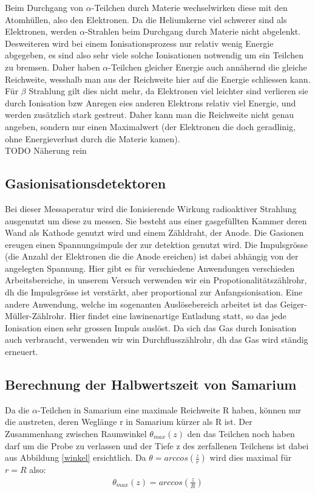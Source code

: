 \documentclass[12pt]{article}
\begin{document}
Beim Durchgang von $\alpha$-Teilchen durch Materie wechselwirken diese mit den Atomhüllen, also den Elektronen. Da die Heliumkerne viel schwerer sind als Elektronen, werden $\alpha$-Strahlen beim Durchgang durch Materie nicht abgelenkt. Desweiteren wird bei einem Ionisationsprozess nur relativ wenig Energie abgegeben, es sind also sehr viele solche Ionisationen notwendig um ein Teilchen zu bremsen. Daher haben $\alpha$-Teilchen gleicher Energie auch annähernd die gleiche Reichweite, wesshalb man aus der Reichweite hier auf die Energie schliessen kann.
\\
Für $\beta$ Strahlung gilt dies nicht mehr, da Elektronen viel leichter sind verlieren sie durch Ionisation bzw Anregen eies anderen Elektrons relativ viel Energie, und werden zusätzlich stark gestreut. Daher kann man die Reichweite nicht genau angeben, sondern nur einen Maximalwert (der Elektronen die doch geradlinig, ohne Energieverlust durch die Materie kamen). \\ TODO Näherung rein
\newpage

\subsection{Gasionisationsdetektoren}

Bei dieser Messaperatur wird die Ionisierende Wirkung radioaktiver Strahlung ausgenutzt um diese zu messen. Sie besteht aus einer gasgefüllten Kammer deren Wand als Kathode genutzt wird und einem Zähldraht, der Anode. Die Gasionen ereugen einen Spannungsimpuls der zur detektion genutzt wird. Die Impulsgrösse (die Anzahl der Elektronen die die Anode ereichen) ist dabei abhängig von der angelegten Spannung. Hier gibt es für verschiedene Anwendungen verschieden Arbeitsbereiche, in unserem Versuch verwenden wir ein Propotionalitätszählrohr, dh die Impulsgrösse ist verstärkt, aber proportional zur Anfangsionisation. Eine andere Anwendung, welche im sogenanten Auslösebereich arbeitet ist das Geiger-Müller-Zählrohr. Hier findet eine lawinenartige Entladung statt, so das jede Ionisation einen sehr grossen Impuls auslöst. Da sich das Gas durch Ionisation auch verbraucht, verwenden wir win Durchflusszählrohr, dh das Gas wird ständig erneuert.

\subsection{Berechnung der Halbwertszeit von Samarium}
Da die $\alpha$-Teilchen in Samarium eine maximale Reichweite R haben, können nur die austreten, deren Weglänge r in Samarium kürzer als R ist. Der Zusammenhang zwischen Raumwinkel $\theta_{max}(z)$ den das Teilchen noch haben darf um die Probe zu verlassen und der Tiefe z des zerfallenen Teilchens ist dabei aus Abbildung \ref{winkel} ersichtlich.
Da $\theta = arccos(\frac{z}{r})$ wird dies maximal für $r=R$ also:
\begin{align}
 \theta_{max}(z) = arccos\left( \frac{z}{R} \right)
\end{align}
\end{document}

